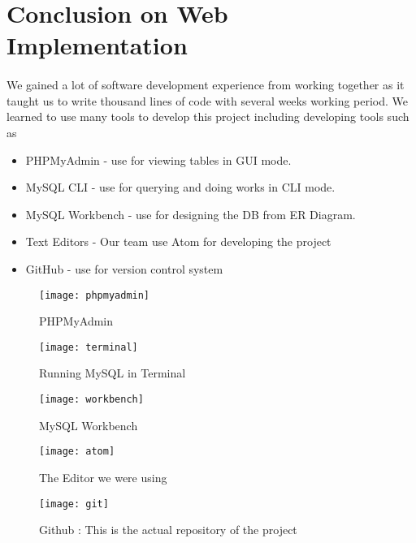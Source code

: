     \section{Conclusion on Web Implementation}
      \paragraph{}
        We gained a lot of software development experience from working together as it taught us to write thousand lines of code with several weeks working period.
        We learned to use many tools to develop this project including developing tools such as
      \begin{itemize}
        \item PHPMyAdmin - use for viewing tables in GUI mode.
        \item MySQL CLI - use for querying and doing works in CLI mode.
        \item MySQL Workbench - use for designing the DB from ER Diagram.
        \item Text Editors - Our team use Atom for developing the project
        \item GitHub - use for version control system
      \end{itemize}
      \begin{center}
        \begin{figure}[!h]
          \texttt{[image: phpmyadmin]}
          \caption{PHPMyAdmin}
        \end{figure}
        \begin{figure}[!h]
          \texttt{[image: terminal]}
          \caption{Running MySQL in Terminal}
        \end{figure}
        \begin{figure}[!h]
          \texttt{[image: workbench]}
          \caption{MySQL Workbench}
        \end{figure}

        \begin{center}
          \begin{figure}[!h]
            \texttt{[image: atom]}
            \caption{The Editor we were using}
          \end{figure}
        \end{center}

        \begin{figure}[!h]
          \texttt{[image: git]}
          \caption{Github : This is the actual repository of the project}
        \end{figure}
      \end{center}


